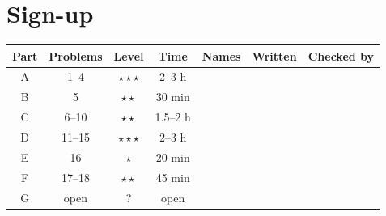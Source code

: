\documentclass[11pt]{article}
\newcommand{\easy}{$\star$}
\newcommand{\medium}{$\star\star$}
\newcommand{\hard}{$\star\star\star$}
\begin{document}
\section*{Sign-up}

\begin{center}
\renewcommand{\arraystretch}{1.7}
\begin{tabular}{|c|c|c|c|p{}|c|c|}
\hline
Part & Problems & Level & Time & Names & Written & Checked by \\ \hline
A & 1--4 & \hard & 2--3 h & & & \\ \hline
B & 5 & \medium & 30 min & & & \\ \hline
C & 6--10 & \medium & 1.5--2 h & & & \\ \hline
D & 11--15 & \hard & 2--3 h & & & \\ \hline
E & 16 & \easy & 20 min & & & \\ \hline
F & 17--18 & \medium & 45 min & & & \\ \hline
G & open & ? & open & & & \\ \hline
\end{tabular}
\end{center}
\end{document}
